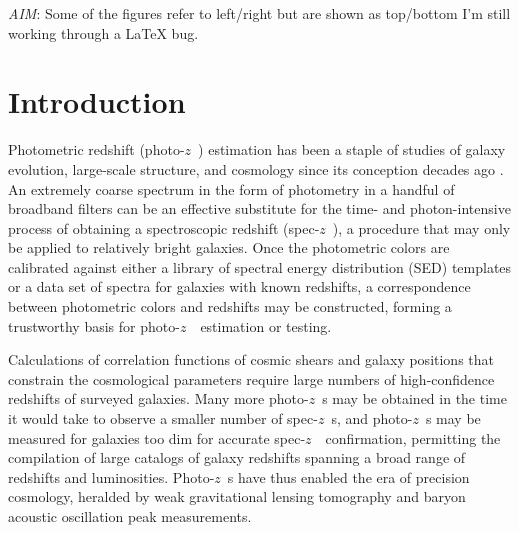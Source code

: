 \documentclass[iop]{emulateapj}
\newcommand{\todo}[3]{{\color{#2}\emph{#1}: #3}}
\newcommand{\aim}[1]{\todo{AIM}{red}{#1}}
\newcommand{\sz}{spec-$z$~}
\newcommand{\pz}{photo-$z$~}
\newcommand{\Pz}{Photo-$z$~}
\begin{document}

\maketitle

\aim{Some of the figures refer to left/right but are shown as top/bottom \textemdash I'm still working through a LaTeX bug.}

\section{Introduction}
\label{sec:introduction}

Photometric redshift (\pz) estimation has been a staple of studies of galaxy evolution, large-scale structure, and cosmology since its conception decades ago \citep{baum_photoelectric_1962}.  
An extremely coarse spectrum in the form of photometry in a handful of broadband filters can be an effective substitute for the time- and photon-intensive process of obtaining a spectroscopic redshift (\sz), a procedure that may only be applied to relatively bright galaxies.  
Once the photometric colors are calibrated against either a library of spectral energy distribution (SED) templates or a data set of spectra for galaxies with known redshifts, a correspondence between photometric colors and redshifts may be constructed, forming a trustworthy basis for \pz\ estimation or testing.

Calculations of correlation functions of cosmic shears and galaxy positions that constrain the cosmological parameters require large numbers of high-confidence redshifts of surveyed galaxies.  
Many more \pz s may be obtained in the time it would take to observe a smaller number of \sz s, and \pz s may be measured for galaxies too dim for accurate \sz\ confirmation, permitting the compilation of large catalogs of galaxy redshifts spanning a broad range of redshifts and luminosities.  
\Pz s have thus enabled the era of precision cosmology, heralded by weak gravitational lensing tomography and baryon acoustic oscillation peak measurements.  
\end{document}
